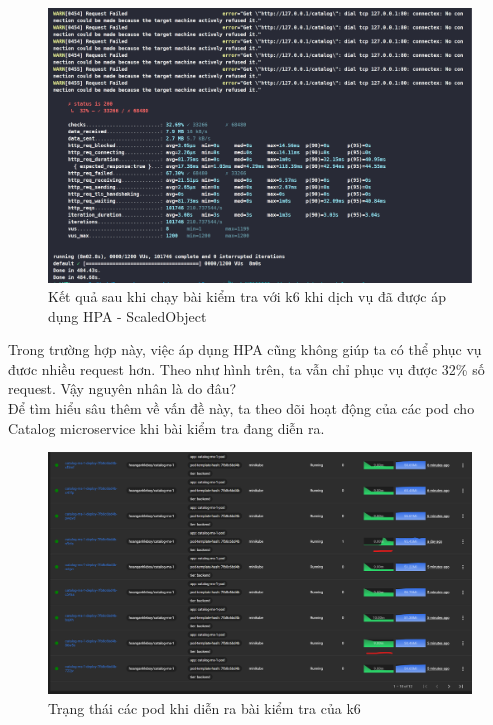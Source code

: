 \begin{figure}[H]
  \begin{center}
    \includegraphics[scale=0.44]{images/hanh/test-with-hpa.png}
    \caption{Kết quả sau khi chạy bài kiểm tra với k6 khi dịch vụ đã được áp dụng HPA - ScaledObject}
  \end{center}
  \label{}
\end{figure}
Trong trường hợp này, việc áp dụng HPA cũng không giúp ta có thể phục vụ đươc nhiều request hơn. Theo như hình trên, ta vẫn chỉ phục vụ được 32\% số request. Vậy nguyên nhân là do đâu?\\[0.5cm]
Để tìm hiểu sâu thêm về vấn đề này, ta theo dõi hoạt động của các pod cho Catalog microservice khi bài kiểm tra đang diễn ra.
\begin{figure}[H]
  \begin{center}
    \includegraphics[scale=0.44]{images/hanh/test-with-hpa-pod-resource-ultilization.png}
  \end{center}
  \caption{Trạng thái các pod khi diễn ra bài kiểm tra của k6}
  \label{fig:pod-status-k6}
\end{figure}
